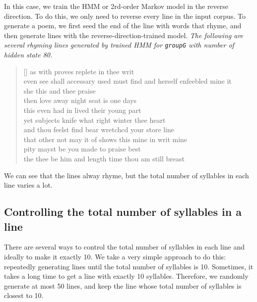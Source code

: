 In this case, we train the HMM or 2rd-order Markov model in the reverse direction. To do this, we only need to reverse every line in the input corpus. To generate a poem, we first seed the end of the line with words that rhyme, and then generate lines with the reverse-direction-trained model. \textit{The following are several rhyming lines generated by trained HMM for \texttt{groupG} with number of hidden state 80.}
\settowidth{\versewidth}{even  see  shall  accessary  used  must  find  and  herself  enfeebled  mine  it}
\begin{verse}[\versewidth]
 as  with  proves  replete  in  thee  writ \\
 even  see  shall  accessary  used  must  find  and  herself  enfeebled  mine  it  \\
 she  this  and  thee  praise  \\
 then  love  away  night  seat  is  one  days  \\
 this  even  had  in  lived  their  young  part  \\
 yet  subjects  knife  what  right  winter  thee  heart  \\
 and  thou  feelst  find  bear  wretchcd  your  store  line  \\
 that  other  not  may  it  of  shows  this  mine  in  writ  mine  \\
 pity  mayst  be  you  made  to  praise  best  \\
 the  thee  be  him  and  length  time  thou  am  still  breast  
\end{verse}
We can see that the lines alway rhyme, but the total number of syllables in each line varies a lot.

\subsection{Controlling the total number of syllables in a line}\label{sec:syllablecount}
There are several ways to control the total number of syllables in each line and ideally to make it exactly 10. We take a very simple approach to do this: repeatedly generating lines until the total number of syllables is 10. Sometimes, it takes a long time to get a line with exactly 10 syllables. Therefore, we randomly generate at most 50 lines, and keep the line whose total number of syllables is closest to 10.


